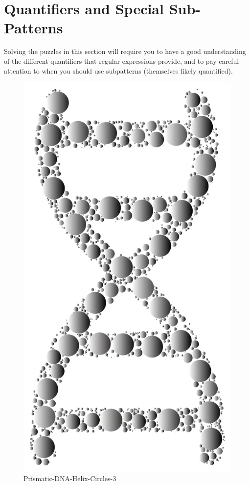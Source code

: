 \hypertarget{quantifiers-and-special-sub-patterns}{%
\chapter{Quantifiers and Special
Sub-Patterns}\label{quantifiers-and-special-sub-patterns}}

Solving the puzzles in this section will require you to have a good
understanding of the different quantifiers that regular expressions
provide, and to pay careful attention to when you should use subpatterns
(themselves likely quantified).

\begin{figure}
\centering
\includegraphics{images/Prismatic-DNA-Helix-Circles-3.svg}
\caption{Prismatic-DNA-Helix-Circles-3}
\end{figure}

